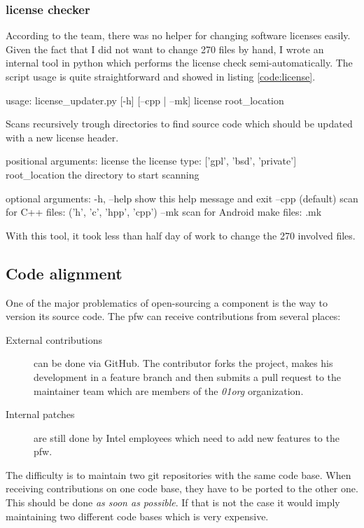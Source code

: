\subsubsection{license checker}
According to the team, there was no helper for changing software licenses easily.
Given the fact that I did not want to change 270 files by hand, I
wrote an internal tool in \gls{python} which performs the license check semi-automatically.
The script usage is quite straightforward and showed in listing \ref{code:license}.

\begin{code}[language=bash, caption=License checker usage, label=code:license]
usage: license_updater.py [-h] [--cpp | --mk] license root_location

Scans recursively trough directories to find source code which should be
updated with a new license header.

positional arguments:
    license        the license type: ['gpl', 'bsd', 'private']
    root_location  the directory to start scanning

optional arguments:
    -h, --help     show this help message and exit
    --cpp          (default) scan for C++ files: ('h', 'c', 'hpp', 'cpp')
    --mk           scan for Android make files: .mk
\end{code}

With this tool, it took less than half day of work to change the 270 involved files.


\subsection{Code alignment}
One of the major problematics of open-sourcing a component is the way to version its source code.
The \gls{pfw} can receive contributions from several places:
\begin{description}
    \item[External contributions] can be done via \gls{GitHub}. The contributor forks the project, makes his development in a feature
        branch and then submits a pull request to the maintainer team which are members of the \emph{01org} organization.
    \item[Internal patches] are still done by Intel employees which need to add new features to the \gls{pfw}.
\end{description}
The difficulty is to maintain two \gls{git} repositories with the same code base. When receiving contributions on one code base, they
have to be ported to the other one. This should be done \emph{as soon as possible}. If that is not the case it would imply maintaining two different
code bases which is very expensive.

